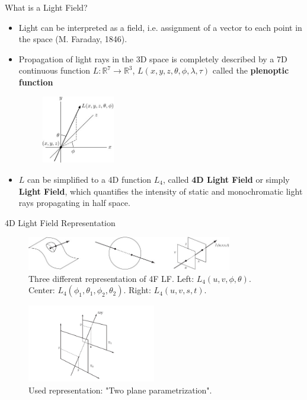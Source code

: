 \begin{frame}{What is a Light Field?}
\begin{block}{}
\begin{itemize}

\item Light can be interpreted as a field, i.e. assignment of a vector to each point in the space (M. Faraday, 1846).

\pause

\item Propagation of light rays in the 3D space is completely described by a 7D continuous function $L:\mathbb{R}^7\longrightarrow \mathbb{R}^3$, $L(x,y,z,\theta,\phi, \lambda, \tau)$ called the \textbf{plenoptic function}

\pause
\begin{figure}[h!]
\centering
\includegraphics[width=0.3\textwidth]{./images/Plenoptic_function.jpg}
\end{figure}

\pause

\item $L$ can be simplified to a 4D function $L_4$, called \textbf{4D Light Field} or simply \textbf{Light Field}, which quantifies the intensity of static and monochromatic light rays propagating in half space. 
\end{itemize}
\end{block}
\end{frame}

\begin{frame}{4D Light Field Representation}
\begin{figure}[h!]
\includegraphics[width=0.8\textwidth]{./images/Light-field-parametrizations.jpg}
\caption{Three different representation of 4F LF\@. Left: $L_4(u,v,\phi,\theta)$. Center: $L_4(\phi_1,\theta_1,\phi_2,\theta_2)$. Right: $L_4(u,v,s,t)$.}
\end{figure}
\pause
\begin{figure}[h!]
\centering
\includegraphics[width=0.5\textwidth]{./images/two-planes_param.jpg}
\caption{Used representation: "Two plane parametrization".}
\label{fig:C2S0F3}
\end{figure}
\end{frame} 

